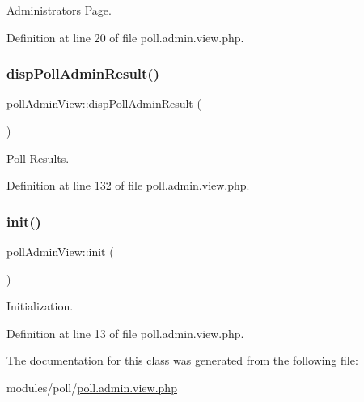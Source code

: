 Administrator\textquotesingle{}s Page. 



Definition at line 20 of file poll.\+admin.\+view.\+php.

\mbox{\label{classpollAdminView_ae05b1788a9f40401af695a961137663a}} 
\subsubsection{\texorpdfstring{disp\+Poll\+Admin\+Result()}{dispPollAdminResult()}}
{\footnotesize\ttfamily poll\+Admin\+View\+::disp\+Poll\+Admin\+Result (\begin{DoxyParamCaption}{ }\end{DoxyParamCaption})}



Poll Results. 



Definition at line 132 of file poll.\+admin.\+view.\+php.

\mbox{\label{classpollAdminView_af5d64cefd4797770bd159956c19bb48b}} 
\subsubsection{\texorpdfstring{init()}{init()}}
{\footnotesize\ttfamily poll\+Admin\+View\+::init (\begin{DoxyParamCaption}{ }\end{DoxyParamCaption})}



Initialization. 



Definition at line 13 of file poll.\+admin.\+view.\+php.



The documentation for this class was generated from the following file\+:\begin{DoxyCompactItemize}
\item 
modules/poll/\hyperlink{poll_8admin_8view_8php}{poll.\+admin.\+view.\+php}\end{DoxyCompactItemize}
